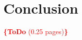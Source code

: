 \documentclass[conference]{IEEEtran}
\newcommand{\todo}[1]{\noindent\textcolor{red}{{\bf \{ToDo} #1{\bf \}}}}
\begin{document}
%
%
%
%


\section{Conclusion}
\label{sec:conclusion}
\todo{(0.25 pages)}
\end{document}
